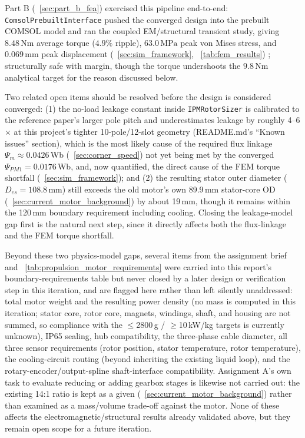 \documentclass[10pt,final,journal,a4paper,oneside,twocolumn]{IEEEtran}
\begin{document}
Part B (\sectionname~\ref{sec:part_b_fea}) exercised this pipeline end-to-end: \texttt{ComsolPrebuiltInterface} pushed the converged design into the prebuilt COMSOL model and ran the coupled EM/structural transient study, giving $8.48\,\text{Nm}$ average torque ($4.9\%$ ripple), $63.0\,\text{MPa}$ peak von Mises stress, and $0.069\,\text{mm}$ peak displacement (\sectionname~\ref{sec:sim_framework}, \tablename~\ref{tab:fem_results}) ; structurally safe with margin, though the torque undershoots the $9.8\,\text{Nm}$ analytical target for the reason discussed below.

Two related open items should be resolved before the design is considered converged: (1) the no-load leakage constant inside \texttt{IPMRotorSizer} is calibrated to the reference paper's larger pole pitch and underestimates leakage by roughly 4--6$\times$ at this project's tighter 10-pole/12-slot geometry (README.md's ``Known issues'' section), which is the most likely cause of the required flux linkage $\Psi_m\approx0.0426$\,Wb (\sectionname~\ref{sec:corner_speed}) not yet being met by the converged $\Psi_{PM1}=0.0176$\,Wb, and, now quantified, the direct cause of the FEM torque shortfall (\sectionname~\ref{sec:sim_framework}); and (2) the resulting stator outer diameter ($D_{es}=108.8\,\text{mm}$) still exceeds the old motor's own 89.9\,mm stator-core OD (\sectionname~\ref{sec:current_motor_background}) by about 19\,mm, though it remains within the 120\,mm boundary requirement including cooling. Closing the leakage-model gap first is the natural next step, since it directly affects both the flux-linkage and the FEM torque shortfall.

Beyond these two physics-model gaps, several items from the assignment brief and \tablename~\ref{tab:propulsion_motor_requirements} were carried into this report's boundary-requirements table but never closed by a later design or verification step in this iteration, and are flagged here rather than left silently unaddressed: total motor weight and the resulting power density (no mass is computed in this iteration; stator core, rotor core, magnets, windings, shaft, and housing are not summed, so compliance with the $\leq$2800\,g / $\geq$10\,kW/kg targets is currently unknown), IP65 sealing, hub compatibility, the three-phase cable diameter, all three sensor requirements (rotor position, stator temperature, rotor temperature), the cooling-circuit routing (beyond inheriting the existing liquid loop), and the rotary-encoder/output-spline shaft-interface compatibility. Assignment A's own task to evaluate reducing or adding gearbox stages is likewise not carried out: the existing 14:1 ratio is kept as a given (\sectionname~\ref{sec:current_motor_background}) rather than examined as a mass/volume trade-off against the motor. None of these affects the electromagnetic/structural results already validated above, but they remain open scope for a future iteration.



\end{document}
